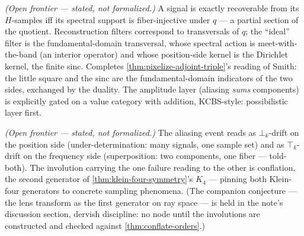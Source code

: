 \begin{theorem}\label{thm:spectral-nyquist}\notready{}
\emph{(Open frontier --- stated, not formalized.)} A signal is exactly recoverable from
its $H$-samples iff its spectral support is fiber-injective under $q$ --- a partial
section of the quotient. Reconstruction filters correspond to transversals of $q$; the
``ideal'' filter is the fundamental-domain transversal, whose spectral action is
meet-with-the-band (an interior operator) and whose position-side kernel is the
Dirichlet kernel, the finite sinc. Completes \cref{thm:pixelize-adjoint-triple}'s
reading of Smith: the little square and the sinc are the fundamental-domain indicators
of the two sides, exchanged by the duality. The amplitude layer (aliasing \emph{sums}
components) is explicitly gated on a value category with addition, KCBS-style:
possibilistic layer first.
\end{theorem}

\begin{theorem}\label{thm:conflation-swaps-failure-modes}\notready{}
\emph{(Open frontier --- stated, not formalized.)} The aliasing event reads as
$\bot_k$-drift on the position side (under-determination: many signals, one sample set)
and as $\top_k$-drift on the frequency side (superposition: two components, one fiber
--- told-both). The involution carrying the one failure reading to the other is
conflation, the second generator of \cref{thm:klein-four-symmetry}'s $K_{4}$ ---
pinning both Klein-four generators to concrete sampling phenomena. (The companion
conjecture --- the lens transform as the first generator on ray space --- is held in
the note's discussion section, dervish discipline: no node until the involutions are
constructed and checked against \cref{thm:conflate-orders}.)
\end{theorem}

